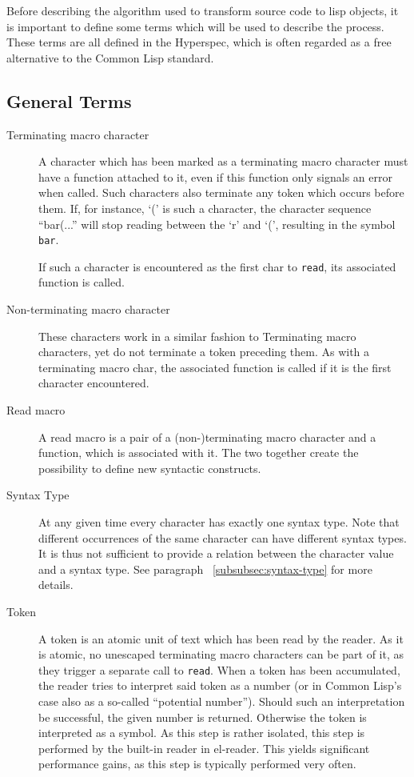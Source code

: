 \documentclass[a4paper,10pt,twoside]{report}
\newcommand{\cl}{Common Lisp}
\newcommand{\elr}{el-reader}
\newcommand{\sym}[1]{\texttt{#1}}
\newcommand{\fun}[1]{\texttt{#1}}
\newcommand{\Read}{\fun{read}}
\begin{document}
Before describing the algorithm used to transform source code to lisp objects,
it is important to define some terms which will be used to describe the
process.  These terms are all defined in the Hyperspec, which is often regarded
as a free alternative to the \cl{} standard.

\subsection{General Terms}
\label{subsubsec:general-terms}

\begin{description}
\item[Terminating macro character] A character which has been marked as a
  terminating macro character must have a function attached to it, even if this
  function only signals an error when called.  Such characters also terminate
  any token which occurs before them.  If, for instance, `(' is such a
  character, the character sequence ``bar(...'' will stop reading between the
  `r' and `(', resulting in the symbol \sym{bar}.

  If such a character is encountered as the first char to \Read{}, its
  associated function is called.
\item[Non-terminating macro character] These characters work in a similar
  fashion to Terminating macro characters, yet do not terminate a token
  preceding them.  As with a terminating macro char, the associated function is
  called if it is the first character encountered.
\item [Read macro] A read macro is a pair of a (non-)terminating macro character
  and a function, which is associated with it.  The two together create the
  possibility to define new syntactic constructs.
\item[Syntax Type] At any given time every character has exactly one syntax
  type.  Note that different occurrences of the same character can have
  different syntax types.  It is thus not sufficient to provide a relation
  between the character value and a syntax type.  See paragraph
  ~\ref{subsubsec:syntax-type} for more details.
\item[Token] A token is an atomic unit of text which has been read by the
  reader.  As it is atomic, no unescaped terminating macro characters can be
  part of it, as they trigger a separate call to \Read{}.  When a token has been
  accumulated, the reader tries to interpret said token as a number (or in
  \cl{}’s case also as a so-called ``potential number'').  Should such an
  interpretation be successful, the given number is returned.  Otherwise the
  token is interpreted as a symbol.  As this step is rather isolated, this step
  is performed by the built-in reader in \elr{}.  This yields significant
  performance gains, as this step is typically performed very often.
\end{description}
\end{document}
